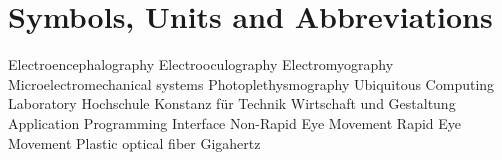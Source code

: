 \chapter*{Symbols, Units and Abbreviations}

\begin{acronym}
   {Electroencephalography}
   {Electrooculography}
   {Electromyography}
   {Microelectromechanical systems}
   {Photoplethysmography}
   {Ubiquitous Computing Laboratory}
   {Hochschule Konstanz f\"ur Technik Wirtschaft und Gestaltung}
   {Application Programming Interface}
   {Non-Rapid Eye Movement}
   {Rapid Eye Movement}
   {Plastic optical fiber}
   {Gigahertz}
\end{acronym}

\newpage